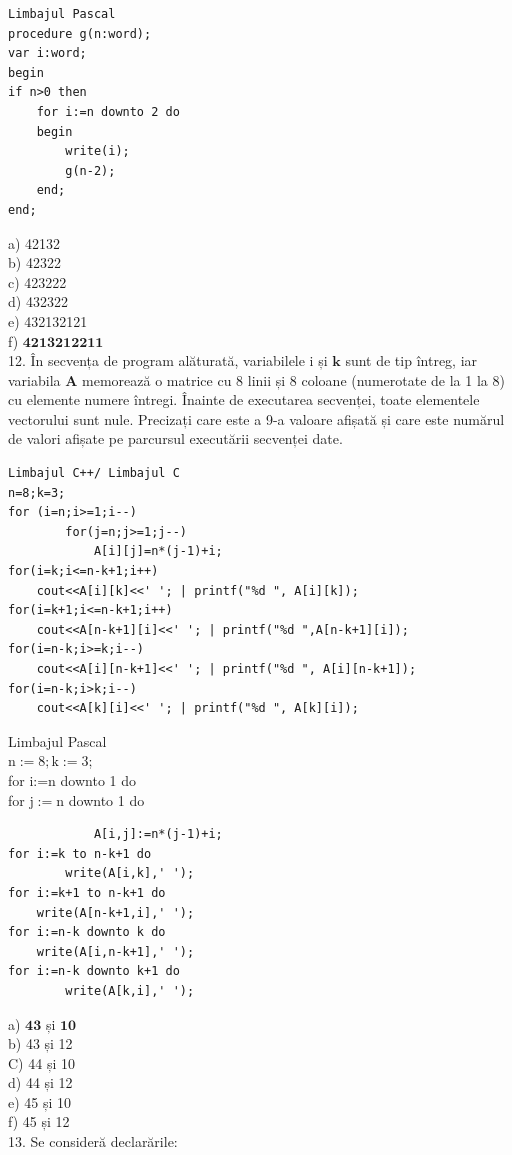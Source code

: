 \documentclass[10pt]{article}
\begin{document}
\begin{verbatim}
Limbajul Pascal
procedure g(n:word);
var i:word;
begin
if n>0 then
    for i:=n downto 2 do
    begin
        write(i);
        g(n-2);
    end;
end;
\end{verbatim}

a) 42132\\
b) 42322\\
c) 423222\\
d) 432322\\
e) 432132121\\
f) $\mathbf{4 2 1 3 2 1 2 2 1 1}$\\
12. În secvența de program alăturată, variabilele i și $\mathbf{k}$ sunt de tip întreg, iar variabila $\mathbf{A}$ memorează o matrice cu 8 linii și 8 coloane (numerotate de la 1 la 8) cu elemente numere întregi. Înainte de executarea secvenței, toate elementele vectorului sunt nule. Precizați care este a 9-a valoare afișată și care este numărul de valori afișate pe parcursul executării secvenței date.

\begin{verbatim}
Limbajul C++/ Limbajul C
n=8;k=3;
for (i=n;i>=1;i--)
        for(j=n;j>=1;j--)
            A[i][j]=n*(j-1)+i;
for(i=k;i<=n-k+1;i++)
    cout<<A[i][k]<<' '; | printf("%d ", A[i][k]);
for(i=k+1;i<=n-k+1;i++)
    cout<<A[n-k+1][i]<<' '; | printf("%d ",A[n-k+1][i]);
for(i=n-k;i>=k;i--)
    cout<<A[i][n-k+1]<<' '; | printf("%d ", A[i][n-k+1]);
for(i=n-k;i>k;i--)
    cout<<A[k][i]<<' '; | printf("%d ", A[k][i]);
\end{verbatim}

Limbajul Pascal\\
$\mathrm{n}:=8 ; \mathrm{k}:=3$;\\
for i:=n downto 1 do\\
for $\mathrm{j}:=\mathrm{n}$ downto 1 do

\begin{verbatim}
            A[i,j]:=n*(j-1)+i;
for i:=k to n-k+1 do
        write(A[i,k],' ');
for i:=k+1 to n-k+1 do
    write(A[n-k+1,i],' ');
for i:=n-k downto k do
    write(A[i,n-k+1],' ');
for i:=n-k downto k+1 do
        write(A[k,i],' ');
\end{verbatim}

a) $\mathbf{4 3}$ și $\mathbf{1 0}$\\
b) 43 și 12\\
C) 44 și 10\\
d) 44 și 12\\
e) 45 și 10\\
f) 45 și 12\\
13. Se consideră declarările:
\end{document}
